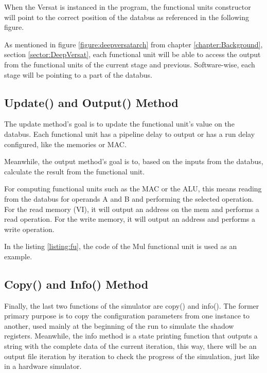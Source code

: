 When the Versat is instanced in the program, the functional units constructor will point
to the correct position of the databus as referenced in the following figure.

As mentioned in figure \ref{figure:deepversatarch} from chapter \ref{chapter:Background}, section \ref{sector:DeepVersat}, 
each functional unit will be able to access the output from the functional units of the
current stage and previous. Software-wise, each stage will be pointing to a part of the databus.  



\subsection{Update() and Output() Method}


The update method's goal is to update the functional unit's value on the databus. 
Each functional unit has a pipeline delay to output or has a run delay configured, 
like the memories or MAC.

Meanwhile, the output method's goal is to, based on the inputs from the databus, calculate the result from
 the functional unit.

 For computing functional units such as the MAC or the ALU, this means reading from the databus for operands A and B
 and performing the selected operation. For the read memory (VI), it will output an address on the mem
 and performs a read operation. For the write memory, it will output an address and performs a write operation.

 In the listing \ref{listing:fu}, the code of the Mul functional unit is used as an example.

 \newpage
 


\subsection{Copy() and Info() Method}

Finally, the last two functions of the simulator are copy() and info(). The former primary purpose is to copy the configuration parameters from one instance to another,
used mainly at the beginning of the run to simulate the shadow registers.
Meanwhile, the info method is a state printing function that outputs a string with the complete data of the current iteration,
this way, there will be an output file iteration by iteration to check the progress of the simulation, just like in a hardware simulator.


